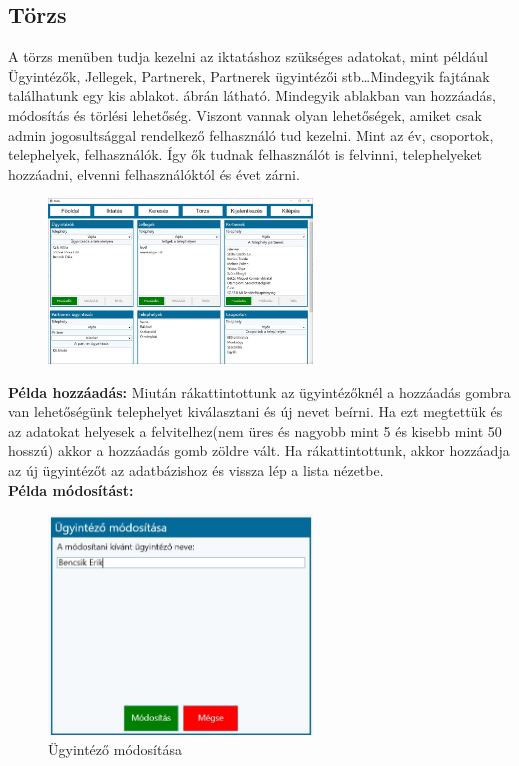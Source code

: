 \documentclass[
]{thesis-ekf}
\theoremstyle{definition}
\theoremstyle{remark}
\begin{document}
\subsection{Törzs}
A törzs menüben tudja kezelni az iktatáshoz szükséges adatokat, mint például Ügyintézők, Jellegek, Partnerek, Partnerek ügyintézői stb\dots Mindegyik fajtának találhatunk egy kis ablakot. \Az{\ref{fig:ctorzs}} ábrán látható. Mindegyik ablakban van hozzáadás, módosítás és törlési lehetőség. Viszont vannak olyan lehetőségek, amiket csak admin jogosultsággal rendelkező felhasználó tud kezelni. Mint az év, csoportok, telephelyek, felhasználók. Így ők tudnak felhasználót is felvinni, telephelyeket hozzáadni, elvenni felhasználóktól és évet zárni. 
\begin{figure}[h!]
	\centering
	\includegraphics[width=7cm]{dokukepek/ctorzs}
	\caption{}
	\label{fig:ctorzs}
\end{figure}
\textbf{Példa hozzáadás:}
Miután rákattintottunk az ügyintézőknél a hozzáadás gombra van lehetőségünk telephelyet kiválasztani és új nevet beírni. Ha ezt megtettük és az adatokat helyesek a felvitelhez(nem üres és nagyobb mint 5 és kisebb mint 50 hosszú) akkor a hozzáadás gomb zöldre vált. Ha rákattintottunk, akkor hozzáadja az új ügyintézőt az adatbázishoz és vissza lép a lista nézetbe. \\
\textbf{Példa módosítást:}
\begin{figure}[h!]
	\centering
	\includegraphics[width=7cm]{dokukepek/ctorzsmod}
	\caption{Ügyintéző módosítása}
	\label{fig:ctorzsmod}
\end{figure}
\end{document}

